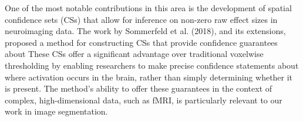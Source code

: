 One of the most notable contributions in this area is the development of spatial confidence sets (CSs) that allow for inference on non-zero raw effect sizes in neuroimaging data. The work by Sommerfeld et al. (2018), and its extensions, proposed a method for constructing CSs that provide confidence guarantees about  These CSs offer a significant advantage over traditional voxelwise thresholding by enabling researchers to make precise confidence statements about where activation occurs in the brain, rather than simply determining whether it is present. The method's ability to offer these guarantees in the context of complex, high-dimensional data, such as fMRI, is particularly relevant to our work in image segmentation.